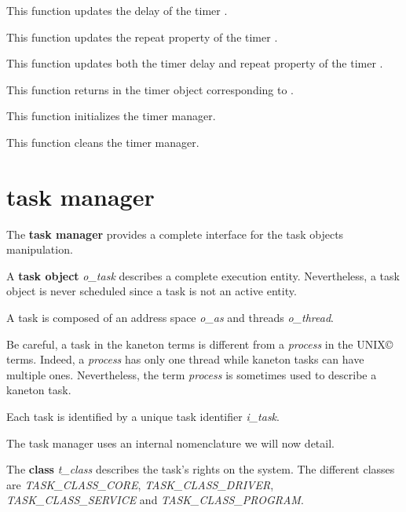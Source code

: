 	 {
	   This function updates the delay of the timer .
	 }

	 {
	   This function updates the repeat property of the timer
	   . %
	 }

	 {
	   This function updates both the timer delay and repeat property
	   of the timer . %
	 }

	 {
	   This function returns in  the timer object
	   corresponding to .
	 }

	 {
	   This function initializes the timer manager.
	 }

	 {
	   This function cleans the timer manager.
	 }

%
%

\section{task manager}

The \textbf{task manager} provides a complete interface for the task
objects manipulation.

A \textbf{task object} \textit{o\_task} describes a complete execution
entity. Nevertheless, a task object is never scheduled since a task
is not an active entity.

A task is composed of an address space \textit{o\_as} and threads
\textit{o\_thread}.

Be careful, a task in the kaneton terms is different from a \textit{process}
in the UNIX{\copyright} terms. Indeed, a \textit{process} has only one
thread while kaneton tasks can have multiple ones. Nevertheless, the
term \textit{process} is sometimes used to describe a kaneton task.

Each task is identified by a unique task identifier \textit{i\_task}.

The task manager uses an internal nomenclature we will now detail.

The \textbf{class} \textit{t\_class} describes the task's rights on the
system. The different classes are \textit{TASK\_CLASS\_CORE},
\textit{TASK\_CLASS\_DRIVER}, \textit{TASK\_CLASS\_SERVICE} and
\textit{TASK\_CLASS\_PROGRAM}.

